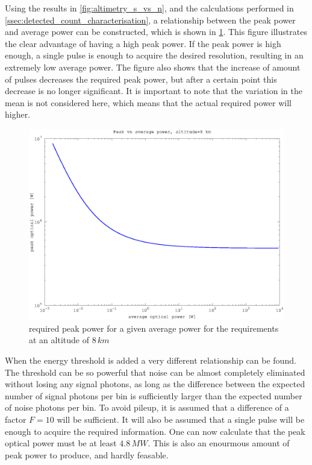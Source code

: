 Using the results in \cref{fig:altimetry_s_vs_n}, and the calculations performed in \cref{ssec:detected_count_characterisation}, a relationship between the peak power and average power can be constructed, which is shown in \cref{fig:peak_vs_av}. This figure illustrates the clear advantage of having a high peak power. If the peak power is high enough, a single pulse is enough to acquire the desired resolution, resulting in an extremely low average power. The figure also shows that the increase of amount of pulses decreases the required peak power, but after a certain point this decrease is no longer significant. It is important to note that the variation in the mean is not considered here, which means that the actual required power will higher.

\begin{figure}[h]
\centering
	\includegraphics[width=0.8\linewidth]{fig/peak_vs_av.eps}
\caption{required peak power for a given average power for the requirements at an altitude of $8\,km$}
\label{fig:peak_vs_av}
\end{figure}

When the energy threshold is added a very different relationship can be found. The threshold can be so powerful that noise can be almost completely eliminated without losing any signal photons, as long as the difference between the expected number of signal photons per bin is sufficiently larger than the expected number of noise photons per bin. To avoid pileup, it is assumed that a difference of a factor $F=10$ will be sufficient. It will also be assumed that a single pulse will be enough to acquire the required information. One can now calculate that the peak optical power must be at least $4.8\,MW$. This is also an enourmous amount of peak power to produce, and hardly feasable.

